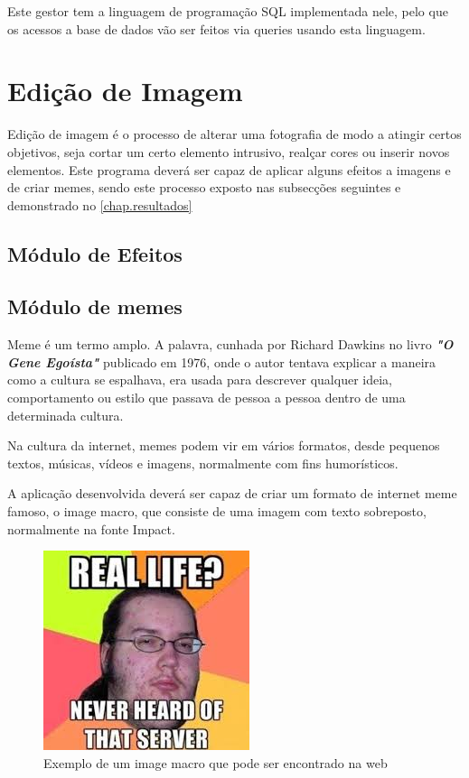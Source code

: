 \documentclass{report}
\begin{document}
Este gestor tem a linguagem de programação SQL implementada nele, pelo que os acessos a base de dados vão ser feitos via queries usando esta linguagem.
\section{Edição de Imagem}
\label{sec.edit}

Edição de imagem é o processo de alterar uma fotografia  de modo a atingir certos objetivos, seja cortar um certo elemento intrusivo, realçar cores ou inserir novos elementos. Este programa deverá ser capaz de aplicar alguns efeitos a imagens e de criar memes, sendo este processo exposto nas subsecções seguintes e demonstrado no \autoref{chap.resultados} 
\subsection{Módulo de Efeitos}



\subsection{Módulo de memes}

Meme é um termo amplo. A palavra, cunhada por Richard Dawkins no livro \textbf{\textit{"O Gene Egoísta"}}  publicado em 1976, onde o autor tentava explicar a maneira como a cultura se espalhava, era usada para descrever qualquer ideia, comportamento ou estilo que passava de pessoa a pessoa dentro de uma determinada cultura. 


Na cultura da internet, memes podem vir em vários formatos, desde pequenos textos, músicas, vídeos e imagens, normalmente com fins humorísticos. 


A aplicação desenvolvida deverá ser capaz de criar um formato de internet meme famoso, o image macro, que consiste de uma imagem com texto sobreposto, normalmente na fonte Impact.

\begin{figure}[!htb]
\label{fig.meme}
\centering
\includegraphics[scale=0.6]{meme}
\caption[Exemplo de Image Macro]{Exemplo de um image macro que pode ser encontrado na web}
\end{figure}
\end{document}
